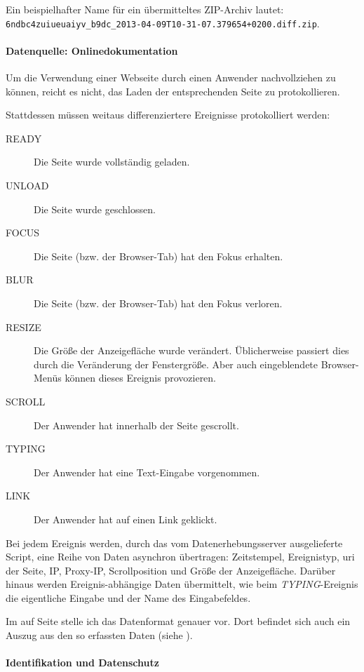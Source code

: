 Ein beispielhafter Name für ein übermitteltes ZIP-Archiv lautet: \texttt{6ndbc4zuiueuaiyv\_b9dc\_2013-04-09T10-31-07.379654+0200.diff.zip}.


\paragraph{Datenquelle: Onlinedokumentation}

Um die Verwendung einer Webseite durch einen Anwender nachvollziehen zu können, reicht es nicht, das Laden der entsprechenden Seite zu protokollieren.

Stattdessen müssen weitaus differenziertere Ereignisse protokolliert werden:
\begin{description}
  \item[READY] Die Seite wurde vollständig geladen.
  \item[UNLOAD] Die Seite wurde geschlossen.
  \item[FOCUS] Die Seite (bzw. der Browser-Tab) hat den Fokus erhalten.
  \item[BLUR] Die Seite (bzw. der Browser-Tab) hat den Fokus verloren.
  \item[RESIZE] Die Größe der Anzeigefläche wurde verändert. Üblicherweise passiert dies durch die Veränderung der Fenstergröße. Aber auch eingeblendete Browser-Menüs können dieses Ereignis provozieren.
  \item[SCROLL] Der Anwender hat innerhalb der Seite gescrollt.
  \item[TYPING] Der Anwender hat eine Text-Eingabe vorgenommen.
  \item[LINK] Der Anwender hat auf einen Link geklickt.
\end{description}

Bei jedem Ereignis werden, durch das vom Datenerhebungsserver ausgelieferte Script, eine Reihe von Daten asynchron übertragen: Zeitstempel, Ereignistyp, \acrshort{uri} der Seite, IP, Proxy-IP, Scrollposition und Größe der Anzeigefläche. Darüber hinaus werden Ereignis-abhängige Daten übermittelt, wie beim \textit{TYPING}-Ereignis die eigentliche Eingabe und der Name des Eingabefeldes.

Im  auf Seite \pageref{sec:doclog} stelle ich das Datenformat genauer vor. Dort befindet sich auch ein Auszug aus den so erfassten Daten (siehe ).



\paragraph{Identifikation und Datenschutz}
\label{sec:id}

